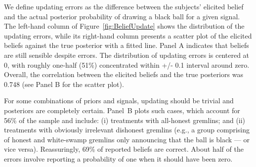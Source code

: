 \documentclass[12pt,a4paper]{article}
\begin{document}
\begin{figure}[H]
	\hfill
	\hfill
\end{figure}

We define updating errors as the difference between the subjects' elicited belief and the actual posterior probability of drawing a black ball for a given signal.  The left-hand column of Figure~\ref{fig:BeliefUpdate} shows the distribution of the updating errors, while its right-hand column presents a scatter plot of the elicited beliefs against the true posterior with a fitted line.
Panel A indicates that beliefs are still sensible despite errors. The distribution of updating errors is centered at 0, with roughly one-half (51\%) concentrated within +/- 0.1 interval around zero. Overall, the correlation between the elicited beliefs and the true posteriors was 0.748 (see Panel B for the scatter plot).  

For some combinations of priors and signals, updating should be trivial and posteriors are completely certain.  
Panel~B plots such cases, which account for 56\% of the sample and include: (i) treatments with all-honest gremlins; and (ii) treatments with obviously irrelevant dishonest gremlins (e.g., a group comprising of honest and white-swamp gremlins only announcing that the ball is black --- or vice versa). Reassuringly, 69\% of reported beliefs are correct. About half of the errors involve reporting a probability of one when it should have been zero.
\end{document}
